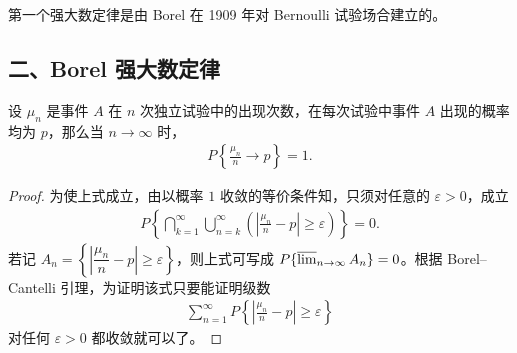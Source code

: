 \documentclass[../../main.tex]{subfiles}
\begin{document}
第一个强大数定律是由 Borel 在 1909 年对 Bernoulli 试验场合建立的。

\subsection*{二、Borel 强大数定律}

\begin{theorem}[Borel]\label{theorem:ch05-Borel强大数定律}
设 $\mu_n$ 是事件 $A$ 在 $n$ 次独立试验中的出现次数，在每次试验中事件 $A$ 出现的概率均为 $p$，那么当 $n\to\infty$ 时，
\begin{align}
P\!\left\{\frac{\mu_n}{n}\to p\right\}=1.
\end{align}
\end{theorem}

\begin{proof}
为使上式成立，由以概率 $1$ 收敛的等价条件知，只须对任意的 $\varepsilon>0$，成立
\begin{align}
P\!\left\{\bigcap_{k=1}^{\infty}\bigcup_{n=k}^{\infty}\left(\left|\frac{\mu_n}{n}-p\right|\geqslant\varepsilon\right)\right\}=0.
\end{align}
若记 $A_n=\left\{\left|\dfrac{\mu_n}{n}-p\right|\geqslant\varepsilon\right\}$，则上式可写成 $P\{\varlimsup_{n\to\infty}A_n\}=0$。根据 Borel--Cantelli 引理，为证明该式只要能证明级数
\begin{align}
\sum_{n=1}^{\infty}P\!\left\{\left|\frac{\mu_n}{n}-p\right|\geqslant\varepsilon\right\}
\end{align}
对任何 $\varepsilon>0$ 都收敛就可以了。


\end{proof}
\end{document}
